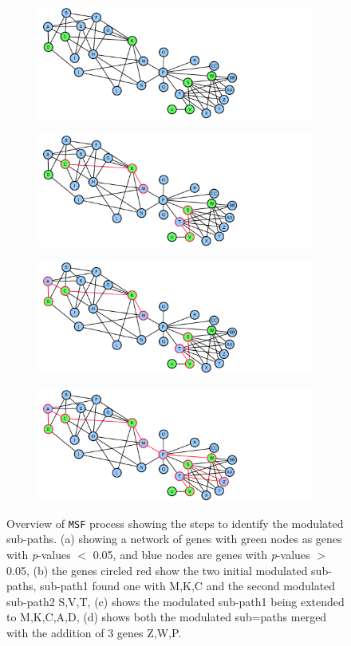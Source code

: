 \documentclass[twocolumn]{article}
\begin{document}
\begin{figure}[ht!]
	
	\begin{subfigure}{.5\textwidth}
		\centering
		\includegraphics[width=10.0cm]{Tgfb1.png} 
		\caption{}
	\end{subfigure}
	\begin{subfigure}{.5\textwidth}
		\centering
		\includegraphics[width=10.0cm]{TGFBstep1.png}
		\caption{}
	\end{subfigure}
	\begin{subfigure}{.5\textwidth}
		\centering
		\includegraphics[width=10.0cm]{TGFBstep2.png} 
		\caption{}
	\end{subfigure}
	\begin{subfigure}{.5\textwidth}
		\centering
		\includegraphics[width=10.0cm]{TGFBstep3.png}
		\caption{}
	\end{subfigure}
	\caption{Overview of \texttt{MSF} process showing the steps to identify the modulated sub-paths. (a) showing a network of genes with green nodes as genes with \textit{p}-values $< $ 0.05, and blue nodes are genes with \textit{p}-values $>$ 0.05, (b) the genes circled red show the two initial modulated sub-paths, sub-path1 found one with M,K,C and the second modulated sub-path2 S,V,T, (c) shows the modulated sub-path1 being extended to M,K,C,A,D, (d) shows both the modulated sub=paths merged with the addition of 3 genes Z,W,P.}
\end{figure}
\end{document}
